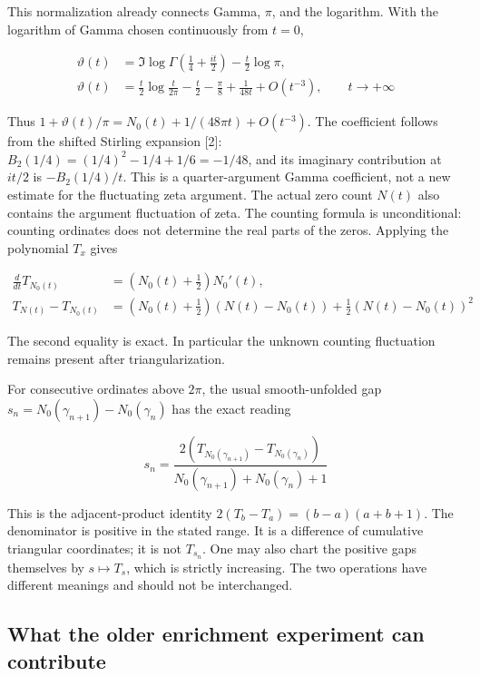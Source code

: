 \documentclass[
  11pt,
]{book}
\begin{document}
This normalization already connects Gamma, \(\pi\), and the logarithm.
With the logarithm of Gamma chosen continuously from \(t=0\),

\[
\begin{aligned}
\vartheta(t)&=\Im\log\Gamma\!\left(\frac14+\frac{it}{2}\right)
-\frac t2\log\pi,\\
\vartheta(t)&=\frac t2\log\frac{t}{2\pi}-\frac t2-\frac\pi8+\frac1{48t}+O(t^{-3}),
\qquad t\to+\infty
\end{aligned}
\tag{168.3}
\]

Thus \(1+\vartheta(t)/\pi=N_0(t)+1/(48\pi t)+O(t^{-3})\). The
coefficient follows from the shifted Stirling expansion {[}2{]}:
\(B_2(1/4)=(1/4)^2-1/4+1/6=-1/48\), and its imaginary contribution at
\(it/2\) is \(-B_2(1/4)/t\). This is a quarter-argument Gamma
coefficient, not a new estimate for the fluctuating zeta argument. The
actual zero count \(N(t)\) also contains the argument fluctuation of
zeta. The counting formula is unconditional: counting ordinates does not
determine the real parts of the zeros. Applying the polynomial \(T_x\)
gives

\[
\begin{aligned}
\frac{d}{dt}T_{N_0(t)}&=\left(N_0(t)+\frac12\right)N_0'(t),\\
T_{N(t)}-T_{N_0(t)}
&=\left(N_0(t)+\frac12\right)(N(t)-N_0(t))
+\frac12(N(t)-N_0(t))^2
\end{aligned}
\tag{168.4}
\]

The second equality is exact. In particular the unknown counting
fluctuation remains present after triangularization.

For consecutive ordinates above \(2\pi\), the usual smooth-unfolded gap
\(s_n=N_0(\gamma_{n+1})-N_0(\gamma_n)\) has the exact reading

\[
\boxed{s_n=
\frac{2\left(T_{N_0(\gamma_{n+1})}-T_{N_0(\gamma_n)}\right)}
{N_0(\gamma_{n+1})+N_0(\gamma_n)+1}}
\tag{168.5}
\]

This is the adjacent-product identity \(2(T_b-T_a)=(b-a)(a+b+1)\). The
denominator is positive in the stated range. It is a difference of
cumulative triangular coordinates; it is not \(T_{s_n}\). One may also
chart the positive gaps themselves by \(s\mapsto T_s\), which is
strictly increasing. The two operations have different meanings and
should not be interchanged.

\subsection{What the older enrichment experiment can
contribute}\label{what-the-older-enrichment-experiment-can-contribute}
\end{document}
